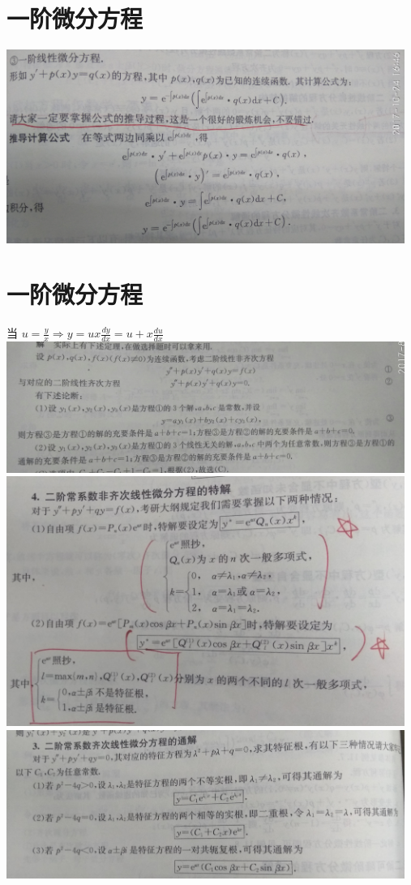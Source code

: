 \documentclass[UTF8]{ctexart}
\begin{document}
\section{一阶微分方程}
\includegraphics[width=13cm]{9345E7/677562795.jpg}

\section{一阶微分方程}
    当 $ u=\frac{y}{x} \Rightarrow y=ux\frac{dy}{dx}=u+x\frac{du}{dx}$
\includegraphics[width=13cm]{9345E7/478763472.jpg}
\includegraphics[width=13cm]{9345E7/595734581.jpg}
\includegraphics[width=13cm]{9345E7/601054614.jpg}
\end{document}
